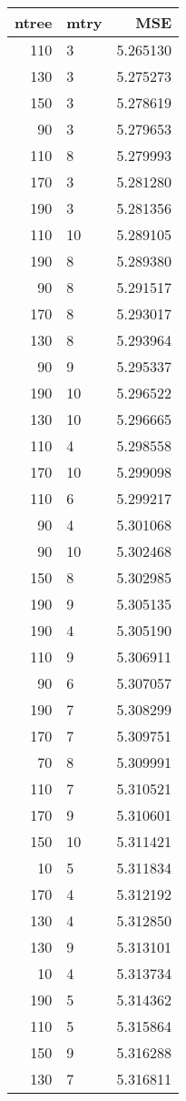 \begin{tabular}{rlr}
\toprule
ntree & mtry & MSE \\
\midrule
110 & 3 & 5.265130 \\
130 & 3 & 5.275273 \\
150 & 3 & 5.278619 \\
90 & 3 & 5.279653 \\
110 & 8 & 5.279993 \\
170 & 3 & 5.281280 \\
190 & 3 & 5.281356 \\
110 & 10 & 5.289105 \\
190 & 8 & 5.289380 \\
90 & 8 & 5.291517 \\
170 & 8 & 5.293017 \\
130 & 8 & 5.293964 \\
90 & 9 & 5.295337 \\
190 & 10 & 5.296522 \\
130 & 10 & 5.296665 \\
110 & 4 & 5.298558 \\
170 & 10 & 5.299098 \\
110 & 6 & 5.299217 \\
90 & 4 & 5.301068 \\
90 & 10 & 5.302468 \\
150 & 8 & 5.302985 \\
190 & 9 & 5.305135 \\
190 & 4 & 5.305190 \\
110 & 9 & 5.306911 \\
90 & 6 & 5.307057 \\
190 & 7 & 5.308299 \\
170 & 7 & 5.309751 \\
70 & 8 & 5.309991 \\
110 & 7 & 5.310521 \\
170 & 9 & 5.310601 \\
150 & 10 & 5.311421 \\
10 & 5 & 5.311834 \\
170 & 4 & 5.312192 \\
130 & 4 & 5.312850 \\
130 & 9 & 5.313101 \\
10 & 4 & 5.313734 \\
190 & 5 & 5.314362 \\
110 & 5 & 5.315864 \\
150 & 9 & 5.316288 \\
130 & 7 & 5.316811 \\

\end{tabular}
